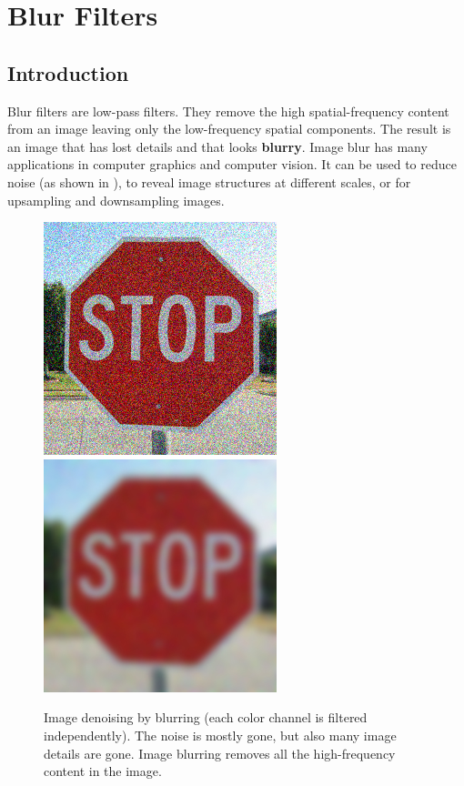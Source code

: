 
\chapter{Blur Filters}
\label{chap:blur_filters}




\section{Introduction}

Blur filters are low-pass filters. They remove the high spatial-frequency content from an image leaving only the low-frequency spatial components. The result is an image that has lost details and that looks {\bf blurry}. Image blur has many applications in computer graphics and computer vision. It can be used to reduce noise (as shown in \fig{\ref{fig:stop_256_noise_3}}), to reveal image structures at different scales, or for upsampling and downsampling images.


\begin{figure}[h]
	\centerline{
		\includegraphics[width=.475\linewidth]{figures/blur_filters/stop_256_noise_3.jpg}~
		\includegraphics[width=.475\linewidth]{figures/blur_filters/stop_256_blur_3.jpg}
	}
	\caption{Image denoising by blurring (each color channel is filtered independently). The noise is mostly gone, but also many image details are gone. Image blurring removes all the high-frequency content in the image.}
	\label{fig:stop_256_noise_3}
\end{figure}

